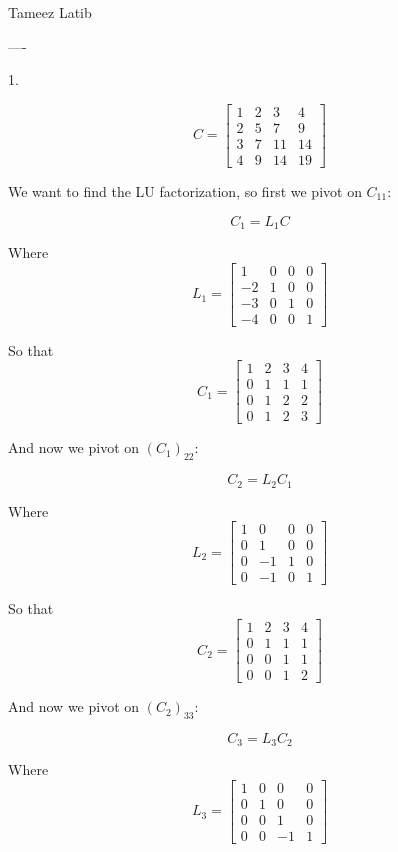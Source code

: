 \documentclass{article}
\begin{document}
Tameez Latib


----

1. 

$$C = 
 \begin{bmatrix}
    1 & 2 & 3 & 4 \\
    2 & 5 & 7 & 9 \\
    3 & 7 & 11 & 14 \\
    4 & 9 & 14 & 19
\end{bmatrix}
$$

We want to find the LU factorization, so first we pivot on $C_{11}$:

$$C_1 = L_1C$$

Where 
$$L_1 = 
\begin{bmatrix}
    1 & 0 & 0 & 0 \\
    -2 & 1 & 0 & 0 \\
    -3 & 0 & 1 & 0 \\
    -4 & 0 & 0 & 1
\end{bmatrix}
$$

So that 
$$C_1 =  
\begin{bmatrix}
    1 & 2 & 3 & 4 \\
    0 & 1 & 1 & 1 \\
    0 & 1 & 2 & 2 \\
    0 & 1 & 2 & 3
\end{bmatrix}
$$

And now we pivot on $(C_1)_{22}$: 

$$C_2 = L_2C_1$$

Where 
$$L_2 = 
\begin{bmatrix}
    1 & 0 & 0 & 0 \\
    0 & 1 & 0 & 0 \\
    0 & -1 & 1 & 0 \\
    0 & -1 & 0 & 1
\end{bmatrix}
$$

So that 
$$C_2 =  
\begin{bmatrix}
    1 & 2 & 3 & 4 \\
    0 & 1 & 1 & 1 \\
    0 & 0 & 1 & 1 \\
    0 & 0 & 1 & 2
\end{bmatrix}
$$


And now we pivot on $(C_2)_{33}$: 

$$C_3 = L_3C_2$$

Where 
$$L_3 = 
\begin{bmatrix}
    1 & 0 & 0 & 0 \\
    0 & 1 & 0 & 0 \\
    0 & 0 & 1 & 0 \\
    0 & 0 & -1 & 1
\end{bmatrix}
$$
\end{document}
